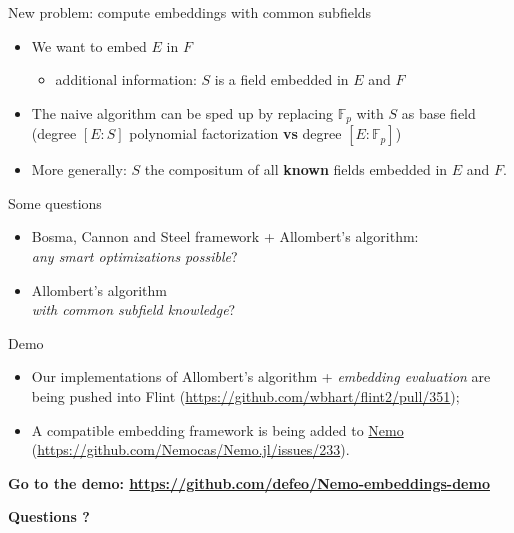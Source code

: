 \documentclass[francais]{beamer}
\def\F {\ensuremath{\mathbb{F}}}
\begin{document}
\begin{frame}{New problem: compute embeddings with common subfields}
  \begin{itemize}
    \item We want to embed $E$ in $F$
      \begin{itemize}
        \item additional information: $S$ is a field embedded in $E$ and $F$
      \end{itemize}
    \item The naive algorithm can be sped up by replacing $\F_p$ with
      $S$ as base field\\
      (degree $[E:S]$ polynomial factorization \textbf{vs} degree
      $[E:\mathbb{F}_p]$)
    \item More generally: $S$ the compositum of all \textbf{known}
      fields embedded in $E$ and $F$.
  \end{itemize}
\end{frame}

\begin{frame}{Some questions}
  \begin{itemize}
  \item Bosma, Cannon and Steel framework + Allombert's algorithm:\\
    \emph{any smart optimizations possible}?
  \item Allombert's algorithm\\ \emph{with common subfield knowledge}?
  \end{itemize}
\end{frame}

\begin{frame}{Demo}
  \begin{itemize}
  \item Our implementations of Allombert's algorithm + \emph{embedding
      evaluation} are being pushed into Flint
    (\url{https://github.com/wbhart/flint2/pull/351});
  \item A compatible embedding framework is being added to
    \href{http://nemocas.org/}{Nemo}
    (\url{https://github.com/Nemocas/Nemo.jl/issues/233}).
  \end{itemize}

  \bigskip
  
  \centering\large\bf
  Go to the demo: \url{https://github.com/defeo/Nemo-embeddings-demo}
\end{frame}

\begin{frame}
\Huge \textbf{Questions ?}
\end{frame}

\begin{frame}[allowframebreaks]\frametitle{\refname}
  \scriptsize
    
    
\end{frame}
\end{document}
